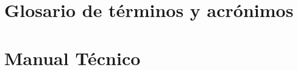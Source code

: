 \documentclass[12pt,a4paper,twoside,openright]{report}
\begin{document}
\begin{appendices}
\chapter{Glosario de términos y acrónimos}
\label{ap:glosario}

\printnoidxglossary[type=abbreviations,title=Acrónimos]
\printnoidxglossary[type=main,title=Términos]

\chapter{Manual Técnico}
\label{ch:manual-tecnico}

\end{appendices}
\end{document}
